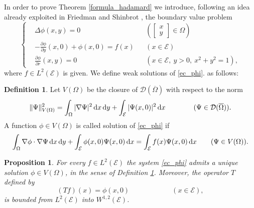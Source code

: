 \documentclass{amsart} %
\numberwithin{equation}{section}
\newtheorem{proposition}[theorem]{Proposition}
\theoremstyle{definition}
\newtheorem{definition}[theorem]{Definition}
\begin{document}
In order to prove Theorem \ref{formula_hadamard} we introduce, following an idea 
already exploited in Friedman and Shinbrot \cite{friedman1967initial},
the boundary value problem
\begin{equation}\label{ec_phi}
\left\{
\begin{aligned}
&\Delta \phi(x,y)=0 &&\left(\begin{bmatrix} x\\ y\end{bmatrix} \in \Omega\right)\\
&-\frac{\partial\phi}{\partial y}(x,0)+ \phi(x,0)=f(x) &&(x\in \mathcal{E})\\
&\frac{\partial\phi}{\partial r}(x,y)=0 &&(x\in \mathcal{E},\ y>0,\ x^2+y^2=1),
\end{aligned}
\right.
\end{equation}
where $f\in L^2(\mathcal{E})$  is given. We define weak solutions of \eqref{ec_phi}.
as follows:

\begin{definition}\label{def_weak_aux}
Let $V(\Omega)$ be the closure of $\mathcal{D}(\overline\Omega)$ with respect to the norm
$$
\|\Psi\|_{V(\Omega)}^2=\int_\Omega|\nabla\Psi|^2\, {\rm d}x\, {\rm d}y+
\int_\mathcal{E} |\Psi(x,0)|^2\, {\rm d}x \qquad\qquad(\Psi\in \mathcal{D}(\overline\Omega)). 
$$
A function $\phi\in V(\Omega)$ is called solution of \eqref{ec_phi} if
\begin{equation}\label{ne_egale}
\int_\Omega \nabla \phi\cdot \nabla \Psi \, {\rm d}x\, {\rm d}y+
\int_\mathcal{E} \phi(x,0)\Psi(x,0)\,{\rm d}x= \int_\mathcal{E} f(x)\Psi(x,0)\, {\rm d}x
\qquad (\Psi\in V(\Omega)).
\end{equation}
\end{definition}

\begin{proposition}\label{prop_robin}
For every $f\in L^2(\mathcal{E})$ the system \eqref{ec_phi} admits a unique solution $\phi\in V(\Omega)$, in the sense
of Definition \ref{def_weak_aux}. Moreover, the operator $T$ defined by 
$$
(Tf)(x)=\phi(x,0) \qquad\qquad\qquad(x\in \mathcal{E}),
$$
is bounded  from $L^2(\mathcal{E})$ into $W^{1,2}(\mathcal{E})$.
\end{proposition}
\end{document}
